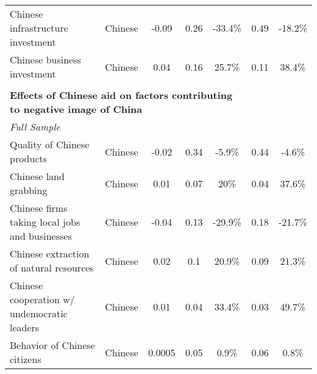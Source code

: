 \begin{tabular}{lcc | cc  | cc}
 Chinese infrastructure investment & Chinese & -0.09 & 0.26 & -33.4\% & 0.49 & -18.2\% \\ 
 Chinese business investment & Chinese & 0.04 & 0.16 & 25.7\% & 0.11 & 38.4\% \\ 
 \multicolumn{3}{l|}{} & \multicolumn{2}{c|}{} & \multicolumn{2}{c}{} \\ 
\multicolumn{5}{l|}{\bf Effects of Chinese aid on factors contributing to negative image of China} & \multicolumn{2}{l}{} \\ 
 \multicolumn{3}{l|}{\emph{Full Sample}} & \multicolumn{2}{c|}{} & \multicolumn{2}{c}{} \\ 
Quality of Chinese products & Chinese & -0.02 & 0.34 & -5.9\% & 0.44 & -4.6\% \\ 
 Chinese land grabbing & Chinese & 0.01 & 0.07 & 20\% & 0.04 & 37.6\% \\ 
 Chinese firms taking local jobs and businesses & Chinese & -0.04 & 0.13 & -29.9\% & 0.18 & -21.7\% \\ 
 Chinese extraction of natural resources & Chinese & 0.02 & 0.1 & 20.9\% & 0.09 & 21.3\% \\ 
 Chinese cooperation w/ undemocratic leaders & Chinese & 0.01 & 0.04 & 33.4\% & 0.03 & 49.7\% \\ 
 Behavior of Chinese citizens & Chinese & 0.0005 & 0.05 & 0.9\% & 0.06 & 0.8\% \\ 
 \hline 
 \end{tabular} 
